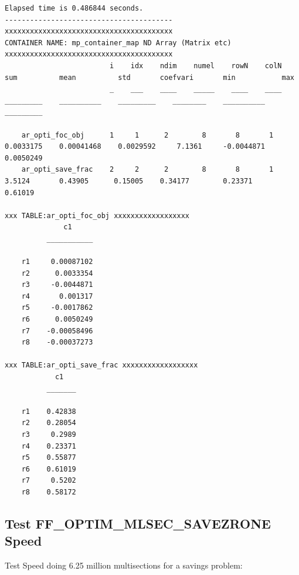 \documentclass[
]{book}
\begin{document}
\begin{verbatim}
Elapsed time is 0.486844 seconds.
----------------------------------------
xxxxxxxxxxxxxxxxxxxxxxxxxxxxxxxxxxxxxxxx
CONTAINER NAME: mp_container_map ND Array (Matrix etc)
xxxxxxxxxxxxxxxxxxxxxxxxxxxxxxxxxxxxxxxx
                         i    idx    ndim    numel    rowN    colN       sum          mean          std       coefvari       min           max   
                         _    ___    ____    _____    ____    ____    _________    __________    _________    ________    __________    _________

    ar_opti_foc_obj      1     1      2        8       8       1      0.0033175    0.00041468    0.0029592     7.1361     -0.0044871    0.0050249
    ar_opti_save_frac    2     2      2        8       8       1         3.5124       0.43905      0.15005    0.34177        0.23371      0.61019

xxx TABLE:ar_opti_foc_obj xxxxxxxxxxxxxxxxxx
              c1     
          ___________

    r1     0.00087102
    r2      0.0033354
    r3     -0.0044871
    r4       0.001317
    r5     -0.0017862
    r6      0.0050249
    r7    -0.00058496
    r8    -0.00037273

xxx TABLE:ar_opti_save_frac xxxxxxxxxxxxxxxxxx
            c1   
          _______

    r1    0.42838
    r2    0.28054
    r3     0.2989
    r4    0.23371
    r5    0.55877
    r6    0.61019
    r7     0.5202
    r8    0.58172
\end{verbatim}

\hypertarget{test-ff_optim_mlsec_savezrone-speed}{%
\subsection{Test FF\_OPTIM\_MLSEC\_SAVEZRONE Speed}\label{test-ff_optim_mlsec_savezrone-speed}}

Test Speed doing 6.25 million multisections for a savings problem:
\end{document}
